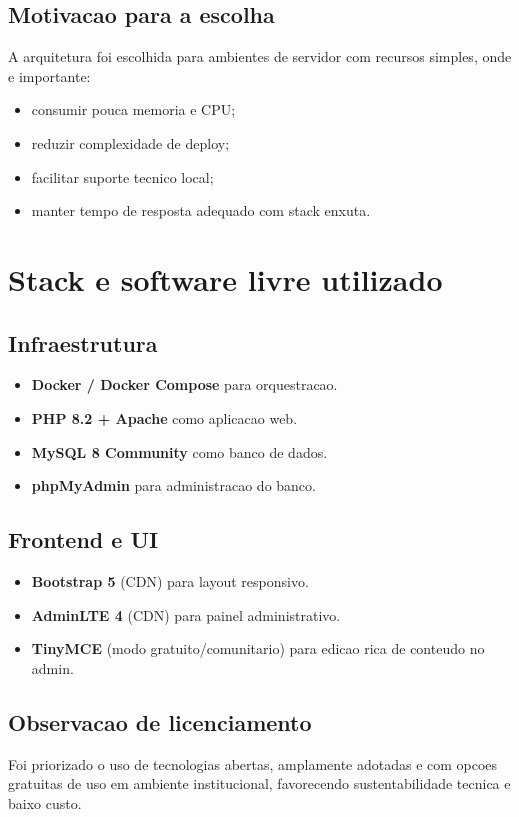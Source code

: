 \documentclass[12pt,a4paper]{article}
\begin{document}
\subsection{Motivacao para a escolha}
A arquitetura foi escolhida para ambientes de servidor com recursos simples, onde e importante:
\begin{itemize}
    \item consumir pouca memoria e CPU;
    \item reduzir complexidade de deploy;
    \item facilitar suporte tecnico local;
    \item manter tempo de resposta adequado com stack enxuta.
\end{itemize}

\section{Stack e software livre utilizado}
\subsection{Infraestrutura}
\begin{itemize}
    \item \textbf{Docker / Docker Compose} para orquestracao.
    \item \textbf{PHP 8.2 + Apache} como aplicacao web.
    \item \textbf{MySQL 8 Community} como banco de dados.
    \item \textbf{phpMyAdmin} para administracao do banco.
\end{itemize}

\subsection{Frontend e UI}
\begin{itemize}
    \item \textbf{Bootstrap 5} (CDN) para layout responsivo.
    \item \textbf{AdminLTE 4} (CDN) para painel administrativo.
    \item \textbf{TinyMCE} (modo gratuito/comunitario) para edicao rica de conteudo no admin.
\end{itemize}

\subsection{Observacao de licenciamento}
Foi priorizado o uso de tecnologias abertas, amplamente adotadas e com opcoes gratuitas de uso em ambiente institucional, favorecendo sustentabilidade tecnica e baixo custo.
\end{document}
